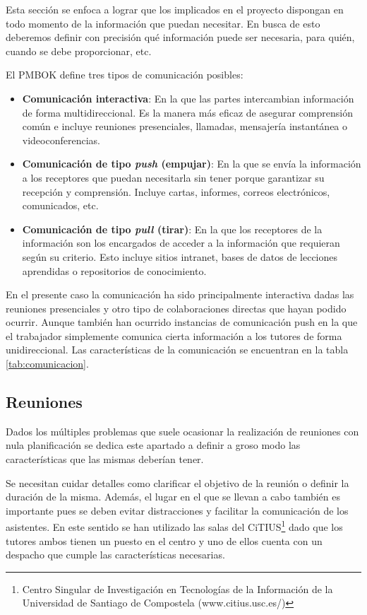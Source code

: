 Esta sección se enfoca a lograr que los implicados en el proyecto dispongan en todo momento de la información que puedan necesitar. En busca de esto deberemos definir con precisión qué información puede ser necesaria, para quién, cuando se debe proporcionar, etc.

\bigskip

El PMBOK\cite{pmbok} define tres tipos de comunicación posibles:

\begin{itemize}
	\item \textbf{Comunicación interactiva}: En la que las partes intercambian información de forma multidireccional. Es la manera más eficaz de asegurar comprensión común e incluye reuniones presenciales, llamadas, mensajería instantánea o videoconferencias.
	\item \textbf{Comunicación de tipo \textit{push} (empujar)}: En la que se envía la información a los receptores que puedan necesitarla sin tener porque garantizar su recepción y comprensión. Incluye cartas, informes, correos electrónicos, comunicados, etc. 
	\item \textbf{Comunicación de tipo \textit{pull} (tirar)}: En la que los receptores de la información son los encargados de acceder a la información que requieran según su criterio. Esto incluye sitios intranet, bases de datos de lecciones aprendidas o repositorios de conocimiento.
\end{itemize}

\bigskip

En el presente caso la comunicación ha sido principalmente interactiva dadas las reuniones presenciales y otro tipo de colaboraciones directas que hayan podido ocurrir. Aunque también han ocurrido instancias de comunicación push en la que el trabajador simplemente comunica cierta información a los tutores de forma unidireccional. Las características de la comunicación se encuentran en la tabla \ref{tab:comunicacion}.

\subsection{Reuniones}

Dados los múltiples problemas que suele ocasionar la realización de reuniones con nula planificación se dedica este apartado a definir a groso modo las características que las mismas deberían tener.

\bigskip

Se necesitan cuidar detalles como clarificar el objetivo de la reunión o definir la duración de la misma. Además, el lugar en el que se llevan a cabo también es importante pues se deben evitar distracciones y facilitar la comunicación de los asistentes. En este sentido se han utilizado las salas del CiTIUS\footnote{Centro Singular de Investigación en Tecnologías de la Información de la Universidad de Santiago de Compostela (www.citius.usc.es/)} dado que los tutores ambos tienen un puesto en el centro y uno de ellos cuenta con un despacho que cumple las características necesarias.

